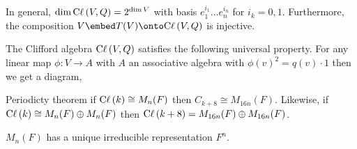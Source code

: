 \documentclass[12pt]{extarticle}
\begin{document}
\begin{rmk}
In general, $\dim{\mathrm{C}\ell \left( V,Q \right)} = 2^{\dim{V}}$ with basis $e_1^{i_1} \dots e_n^{i_n}$ for $i_k = 0,1$. Furthermore, the composition $V \embed T(V) \onto \Cl{V, Q}$ is injective.
\end{rmk}

\begin{prop}
The Clifford algebra $\mathrm{C}\ell \left( V, Q \right)$ satisfies the following universal property. For any linear map $\phi : V \to A$ with $A$ an associative algebra with $\phi(v)^2 = q(v) \cdot 1$ then we get a diagram,
\begin{center}
\end{center}
\end{prop}

\begin{thm}
Periodicty theorem if $\mathrm{C}\ell \left( k \right) \cong M_n(F)$ then $C_{k+8} \cong M_{16 n}(F)$. Likewise, if $\mathrm{C}\ell \left( k \right) \cong M_n(F) \oplus M_n(F)$ then $\mathrm{C}\ell \left( k+8 \right) = M_{16n}(F) \oplus M_{16n}(F)$. 
\end{thm}

\begin{rmk}
$M_n(F)$ has a unique irreducible representation $F^n$. 
\end{rmk}
\end{document}

